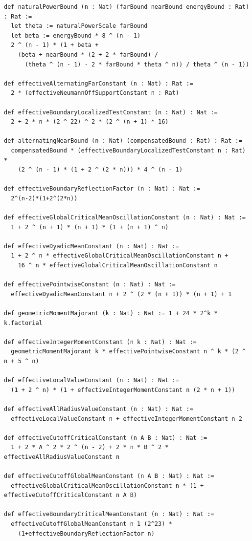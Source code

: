 \documentclass[11pt,a4paper]{article}
\numberwithin{equation}{section}
\theoremstyle{definition}
\theoremstyle{remark}
\begin{document}
\begin{lstlisting}
def naturalPowerBound (n : Nat) (farBound nearBound energyBound : Rat) : Rat :=
  let theta := naturalPowerScale farBound
  let beta := energyBound * 8 ^ (n - 1)
  2 ^ (n - 1) * (1 + beta +
    (beta + nearBound * (2 + 2 * farBound) /
      (theta ^ (n - 1) - 2 * farBound * theta ^ n)) / theta ^ (n - 1))

def effectiveAlternatingFarConstant (n : Nat) : Rat :=
  2 * (effectiveNeumannOffSupportConstant n : Rat)

def effectiveBoundaryLocalizedTestConstant (n : Nat) : Nat :=
  2 + 2 * n * (2 ^ 22) ^ 2 * (2 ^ (n + 1) * 16)

def alternatingNearBound (n : Nat) (compensatedBound : Rat) : Rat :=
  compensatedBound * (effectiveBoundaryLocalizedTestConstant n : Rat) *
    (2 ^ (n - 1) * (1 + 2 ^ (2 * n))) * 4 ^ (n - 1)

def effectiveBoundaryReflectionFactor (n : Nat) : Nat :=
  2^(n-2)*(1+2^(2*n))

def effectiveGlobalCriticalMeanOscillationConstant (n : Nat) : Nat :=
  1 + 2 ^ (n + 1) * (n + 1) * (1 + (n + 1) ^ n)

def effectiveDyadicMeanConstant (n : Nat) : Nat :=
  1 + 2 ^ n * effectiveGlobalCriticalMeanOscillationConstant n +
    16 ^ n * effectiveGlobalCriticalMeanOscillationConstant n

def effectivePointwiseConstant (n : Nat) : Nat :=
  effectiveDyadicMeanConstant n + 2 ^ (2 * (n + 1)) * (n + 1) + 1

def geometricMomentMajorant (k : Nat) : Nat := 1 + 24 * 2^k * k.factorial

def effectiveIntegerMomentConstant (n k : Nat) : Nat :=
  geometricMomentMajorant k * effectivePointwiseConstant n ^ k * (2 ^ n + 5 ^ n)

def effectiveLocalValueConstant (n : Nat) : Nat :=
  (1 + 2 ^ n) * (1 + effectiveIntegerMomentConstant n (2 * n + 1))

def effectiveAllRadiusValueConstant (n : Nat) : Nat :=
  effectiveLocalValueConstant n + effectiveIntegerMomentConstant n 2

def effectiveCutoffCriticalConstant (n A B : Nat) : Nat :=
  1 + 2 * A ^ 2 * 2 ^ (n - 2) + 2 * n * B ^ 2 * effectiveAllRadiusValueConstant n

def effectiveCutoffGlobalMeanConstant (n A B : Nat) : Nat :=
  effectiveGlobalCriticalMeanOscillationConstant n * (1 + effectiveCutoffCriticalConstant n A B)

def effectiveBoundaryCriticalMeanConstant (n : Nat) : Nat :=
  effectiveCutoffGlobalMeanConstant n 1 (2^23) *
    (1+effectiveBoundaryReflectionFactor n)


\end{lstlisting}
\end{document}
